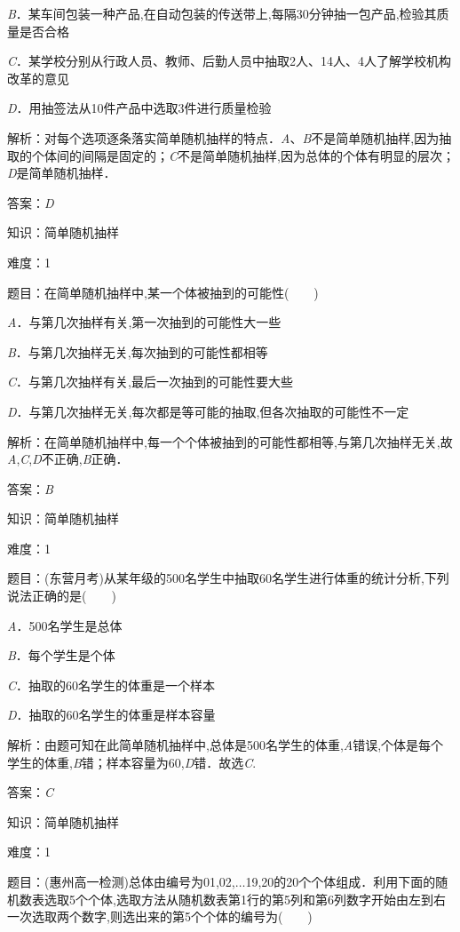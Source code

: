 \documentclass{article} %
\begin{document}
\textit{B}．某车间包装一种产品,在自动包装的传送带上,每隔30分钟抽一包产品,检验其质量是否合格

\textit{C}．某学校分别从行政人员、教师、后勤人员中抽取2人、14人、4人了解学校机构改革的意见

\textit{D}．用抽签法从10件产品中选取3件进行质量检验

解析：对每个选项逐条落实简单随机抽样的特点．\textit{A}、\textit{B}不是简单随机抽样,因为抽取的个体间的间隔是固定的；\textit{C}不是简单随机抽样,因为总体的个体有明显的层次；\textit{D}是简单随机抽样．

答案：\textit{D}

知识：简单随机抽样

难度：1

题目：在简单随机抽样中,某一个体被抽到的可能性(　　)

\textit{A}．与第几次抽样有关,第一次抽到的可能性大一些

\textit{B}．与第几次抽样无关,每次抽到的可能性都相等

\textit{C}．与第几次抽样有关,最后一次抽到的可能性要大些

\textit{D}．与第几次抽样无关,每次都是等可能的抽取,但各次抽取的可能性不一定

解析：在简单随机抽样中,每一个个体被抽到的可能性都相等,与第几次抽样无关,故\textit{A},\textit{C},\textit{D}不正确,\textit{B}正确．

答案：\textit{B}

知识：简单随机抽样

难度：1

题目：(东营月考)从某年级的500名学生中抽取60名学生进行体重的统计分析,下列说法正确的是(　　)

\textit{A}．500名学生是总体

\textit{B}．每个学生是个体

\textit{C}．抽取的60名学生的体重是一个样本

\textit{D}．抽取的60名学生的体重是样本容量

解析：由题可知在此简单随机抽样中,总体是500名学生的体重,\textit{A}错误,个体是每个学生的体重,\textit{B}错；样本容量为60,\textit{D}错．故选\textit{C}.

答案：\textit{C}

知识：简单随机抽样

难度：1

题目：(惠州高一检测)总体由编号为01,02,$\dots$19,20的20个个体组成．利用下面的随机数表选取5个个体,选取方法从随机数表第1行的第5列和第6列数字开始由左到右一次选取两个数字,则选出来的第5个个体的编号为(　　)
\end{document}
